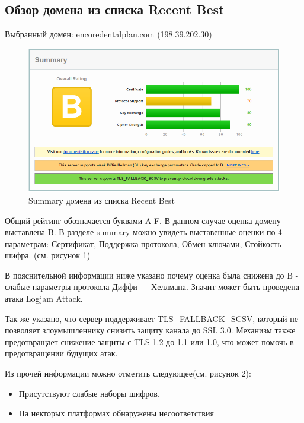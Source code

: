 \documentclass[11pt, a4paper]{article}		%
\begin{document}

\subsection{Обзор домена из списка Recent Best}

Выбранный домен: encoredentalplan.com (198.39.202.30)

\begin{figure}[h!]
\centering
\includegraphics[scale=0.8]{res/summary_best_domain}
\caption{Summary домена из списка Recent Best}
\end{figure}

Общий рейтинг обозначается буквами A-F. В данном случае оценка домену выставлена B. В разделе summary можно увидеть выставенные оценки по 4 параметрам: Сертификат, Поддержка протокола, Обмен ключами, Стойкость шифра. (см. рисунок 1)

В пояснительной информации ниже указано почему оценка была снижена до B - слабые параметры протокола Диффи — Хеллмана. Значит может быть проведена атака Logjam Attack.

Так же указано, что сервер поддерживает TLS\_FALLBACK\_SCSV, который не позволяет злоумышленнику снизить защиту канала до SSL 3.0. Механизм также предотвращает снижение защиты с TLS 1.2 до 1.1 или 1.0, что может помочь в предотвращении будущих атак.

Из прочей информации можно отметить следующее(см. рисунок 2):

\begin{itemize}

\item Присутствуют слабые наборы шифров.

\item На некторых платформах обнаружены несоответствия

\end{itemize}
\end{document}
